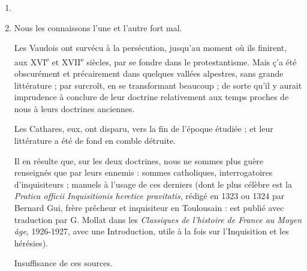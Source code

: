\documentclass[french,twoside]{book} %
\begin{document}
\begin{enumerate}[itemsep=\baselineskip,]
\item[] \hspace{-1.5em}{\bfseries Observations préliminaires :}
\item Nous les connaissons l’une et l’autre fort mal.\par
Les Vaudois ont survécu à la persécution, jusqu’au moment où ils finirent, aux XVI\textsuperscript{e} et XVII\textsuperscript{e} siècles, par se fondre dans le protestantisme. Mais ç’a été obscurément et précairement dans quelques vallées alpestres, sans grande littérature ; par surcroît, en se transformant beaucoup ; de sorte qu’il y aurait imprudence à conclure de leur doctrine relativement aux temps proches de nous à leurs doctrines anciennes.\par
Les Cathares, eux, ont disparu, vers la fin de l’époque étudiée ; et leur littérature a été de fond en comble détruite.\par
Il en résulte que, sur les deux doctrines, nous ne sommes plus guère renseignés que par leurs ennemis : sommes catholiques, interrogatoires d’inquisiteurs ; manuels à l’usage de ces derniers (dont le plus célèbre est la {\itshape Pratica officii Inquisitionis heretice pravitatis}, rédigé en 1323 ou 1324 par Bernard Gui, frère prêcheur et inquisiteur en Toulousain : est publié avec traduction par G. Mollat dans les {\itshape Classiques de l’histoire de France au Moyen âge}, 1926-1927, avec une Introduction, utile à la fois sur l’Inquisition et les hérésies).\par
Insuffisance de ces sources.


\end{enumerate}
\end{document}
